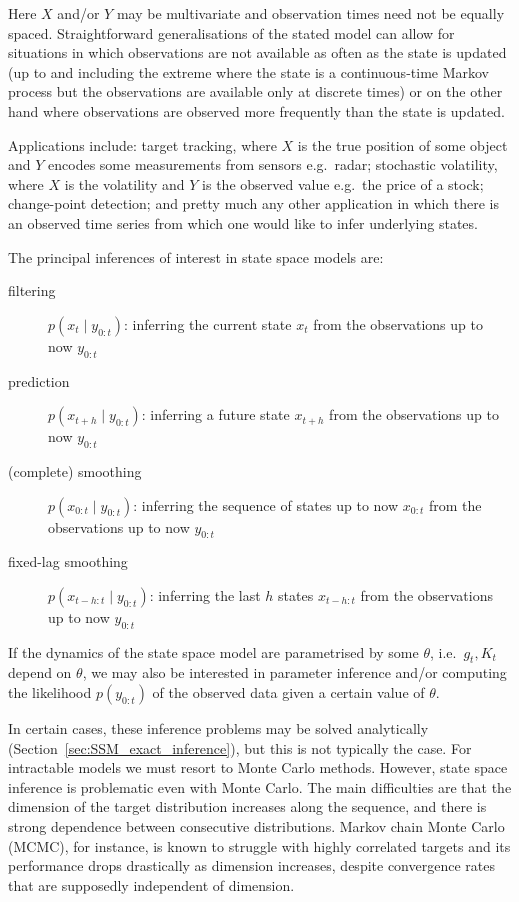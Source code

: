 Here $X$ and/or $Y$ may be multivariate and observation times need not be equally spaced. Straightforward generalisations of the stated model can allow for situations in which observations are not available as often as the state is updated (up to and including the extreme where the state is a continuous-time Markov process but the observations are available only at discrete times) or on the other hand where observations are observed more frequently than the state is updated.

Applications include: target tracking, where $X$ is the true position of some object and $Y$ encodes some measurements from sensors e.g.\ radar; stochastic volatility, where $X$ is the volatility and $Y$ is the observed value e.g.\ the price of a stock; change-point detection; and pretty much any other application in which there is an observed time series from which one would like to infer underlying states.

The principal inferences of interest in state space models are:
\begin{description}
\item [filtering] $p(x_t\mid y_{0:t})$: inferring the current state $x_t$ from the observations up to now $y_{0:t}$
\item [prediction] $p(x_{t+h}\mid y_{0:t})$: inferring a future state $x_{t+h}$ from the observations up to now $y_{0:t}$
\item [(complete) smoothing] $p(x_{0:t}\mid y_{0:t})$: inferring the sequence of states up to now $x_{0:t}$ from the observations up to now $y_{0:t}$
\item [fixed-lag smoothing] $p(x_{t-h:t}\mid y_{0:t})$: inferring the last $h$ states $x_{t-h:t}$ from the observations up to now $y_{0:t}$
\end{description}
If the dynamics of the state space model are parametrised by some $\theta$, i.e.\ $g_t, K_t$ depend on $\theta$, we may also be interested in parameter inference and/or computing the likelihood $p(y_{0:t})$ of the observed data given a certain value of $\theta$.

In certain cases, these inference problems may be solved analytically (Section~\ref{sec:SSM_exact_inference}), but this is not typically the case. For intractable models we must resort to Monte Carlo methods. However, state space inference is problematic even with Monte Carlo. 
The main difficulties are that the dimension of the target distribution increases along the sequence, and there is strong dependence between consecutive distributions. Markov chain Monte Carlo (MCMC), for instance, is known to struggle with highly correlated targets\seb{[citation]} and its performance drops drastically as dimension increases, despite convergence rates that are supposedly independent of dimension\seb{[citation]}.

